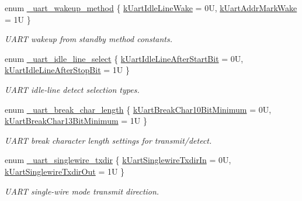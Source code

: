 \begin{DoxyCompactItemize}
\item 
enum \hyperlink{group__uart__hal_gac4479526dd3c0c5406e7c553e2c797d5}{\+\_\+uart\+\_\+wakeup\+\_\+method} \{ \hyperlink{group__uart__hal_ggac4479526dd3c0c5406e7c553e2c797d5a09721a9294ef5eadb137e4a0a9744a58}{k\+Uart\+Idle\+Line\+Wake} = 0U, 
\hyperlink{group__uart__hal_ggac4479526dd3c0c5406e7c553e2c797d5a51f8c90fb648dbd7d2f684d46f05975b}{k\+Uart\+Addr\+Mark\+Wake} = 1U
 \}\begin{DoxyCompactList}\small\item\em U\+A\+RT wakeup from standby method constants. \end{DoxyCompactList}
\item 
enum \hyperlink{group__uart__hal_gafcbb35202aa124845649edb0607d994d}{\+\_\+uart\+\_\+idle\+\_\+line\+\_\+select} \{ \hyperlink{group__uart__hal_ggafcbb35202aa124845649edb0607d994daf6156450600a19995b4c47d0b4358d9d}{k\+Uart\+Idle\+Line\+After\+Start\+Bit} = 0U, 
\hyperlink{group__uart__hal_ggafcbb35202aa124845649edb0607d994da564a13c59cf3aa1cbf7322eb1c0930a9}{k\+Uart\+Idle\+Line\+After\+Stop\+Bit} = 1U
 \}\begin{DoxyCompactList}\small\item\em U\+A\+RT idle-\/line detect selection types. \end{DoxyCompactList}
\item 
enum \hyperlink{group__uart__hal_gafc836c7460339592ca74ec409835dabb}{\+\_\+uart\+\_\+break\+\_\+char\+\_\+length} \{ \hyperlink{group__uart__hal_ggafc836c7460339592ca74ec409835dabba00828d8cd2c2715b3a32f704af22c98c}{k\+Uart\+Break\+Char10\+Bit\+Minimum} = 0U, 
\hyperlink{group__uart__hal_ggafc836c7460339592ca74ec409835dabba2b24dc75d0a4ec4945cc3ec466e0c339}{k\+Uart\+Break\+Char13\+Bit\+Minimum} = 1U
 \}\begin{DoxyCompactList}\small\item\em U\+A\+RT break character length settings for transmit/detect. \end{DoxyCompactList}
\item 
enum \hyperlink{group__uart__hal_ga18cefb04a659432f96e2166b2205765a}{\+\_\+uart\+\_\+singlewire\+\_\+txdir} \{ \hyperlink{group__uart__hal_gga18cefb04a659432f96e2166b2205765aa204dcc6ef033e1c99037078bada5621c}{k\+Uart\+Singlewire\+Txdir\+In} = 0U, 
\hyperlink{group__uart__hal_gga18cefb04a659432f96e2166b2205765aa1687332c34852bebdd0f36334a2b2bb3}{k\+Uart\+Singlewire\+Txdir\+Out} = 1U
 \}\begin{DoxyCompactList}\small\item\em U\+A\+RT single-\/wire mode transmit direction. \end{DoxyCompactList}

\end{DoxyCompactItemize}
